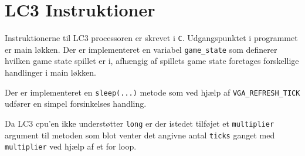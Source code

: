 \section{LC3 Instruktioner}
Instruktionerne til LC3 processoren er skrevet i \texttt{C}. Udgangspunktet i programmet er main løkken. Der er implementeret en variabel \texttt{game\_state} som definerer hvilken game state spillet er i, afhængig af spillets game state foretages forskellige handlinger i main løkken.

Der er implementeret en \texttt{sleep(...)} metode som ved hjælp af \texttt{VGA\_REFRESH\_TICK} udfører en simpel forsinkelses handling.


Da LC3 cpu'en ikke understøtter \texttt{long} er der istedet tilføjet et \texttt{multiplier} argument til metoden som blot venter det angivne antal \texttt{ticks} ganget med \texttt{multiplier} ved hjælp af et for loop.

